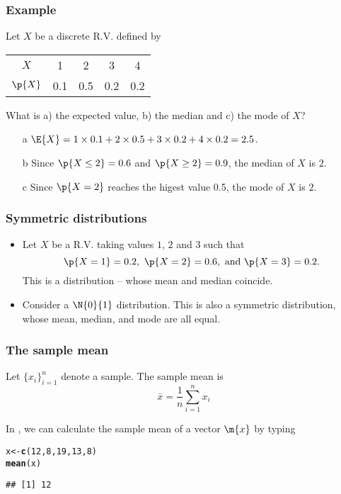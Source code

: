 \documentclass[compress]{beamer}\usepackage[]{graphicx}\usepackage[]{xcolor}
\makeatletter
\newcommand{\hlnum}[1]{\textcolor[rgb]{0.686,0.059,0.569}{#1}}%
\newcommand{\hlstd}[1]{\textcolor[rgb]{0.345,0.345,0.345}{#1}}%
\newcommand{\hlkwb}[1]{\textcolor[rgb]{0.69,0.353,0.396}{#1}}%
\newcommand{\hlkwd}[1]{\textcolor[rgb]{0.737,0.353,0.396}{\textbf{#1}}}%
\newenvironment{kframe}{%
 \def\at@end@of@kframe{}%
 \ifinner\ifhmode%
  \def\at@end@of@kframe{\end{minipage}}%
  \begin{minipage}{\columnwidth}%
 \fi\fi%
 \def\FrameCommand##1{\hskip\@totalleftmargin \hskip-\fboxsep
 \colorbox{shadecolor}{##1}\hskip-\fboxsep
     \hskip-\linewidth \hskip-\@totalleftmargin \hskip\columnwidth}%
 \MakeFramed {\advance\hsize-\width
   \@totalleftmargin\z@ \linewidth\hsize
   \@setminipage}}%
 {\par\unskip\endMakeFramed%
 \at@end@of@kframe}
\newenvironment{knitrout}{}{} %
\makeatother
\begin{document}
\begin{frame}[fragile]
  \frametitle{Example}
    Let $X$ be a discrete R.V. defined by

    \begin{center}
      \begin{tabular}{ccccc}
        \hline
        $X$ &1  &2  &3  &4 \\
        $\p{X}$ &0.1  &0.5  &0.2  &0.2\\
        \hline
      \end{tabular}
    \end{center}

    What is a) the expected value, b) the median and c) the mode of $X$?
    \begin{itemize}
      \item[a] $\E{X} = 1 \times 0.1 + 2 \times 0.5 + 3 \times 0.2 + 4\times 0.2 = 2.5$.
      \item[b] Since $\p{X \leq 2} = 0.6$ and $\p{X \geq 2} = 0.9$, the median of $X$ is $2$.
      \item[c] Since $\p{X = 2}$ reaches the higest value 0.5, the mode of $X$ is $2$.
    \end{itemize}
\end{frame}


\begin{frame}[fragile]
  \frametitle{Symmetric distributions}
    \begin{itemize}
      \item Let $X$ be a R.V. taking values $1$, $2$ and $3$ such that
        \[ \p{X=1} = 0.2,\ \p{X=2} = 0.6, \text{ and } \p{X=3} = 0.2. \]
      This is a  distribution -- whose mean and median coincide.
      \item Consider a $\N{0}{1}$ distribution. This is also a symmetric distribution, whose mean, median, and mode are all equal.
    \end{itemize}
\end{frame}


\begin{frame}[fragile]
  \frametitle{The sample mean}
    Let $\{x_i\}_{i=1}^n$ denote a sample. The sample mean is
      \[ \bar{x} = \frac{1}{n} \sum_{i=1}^n x_i \]

    In \CR, we can calculate the sample mean of a vector $\m{x}$ by typing
\begin{knitrout}
\color{fgcolor}\begin{kframe}
\begin{alltt}
  \hlstd{x} \hlkwb{<-} \hlkwd{c}\hlstd{(}\hlnum{12}\hlstd{,} \hlnum{8}\hlstd{,} \hlnum{19}\hlstd{,} \hlnum{13}\hlstd{,} \hlnum{8}\hlstd{)}
  \hlkwd{mean}\hlstd{(x)}
\end{alltt}
\begin{verbatim}
## [1] 12
\end{verbatim}
\end{kframe}
\end{knitrout}
\end{frame}
\end{document}
